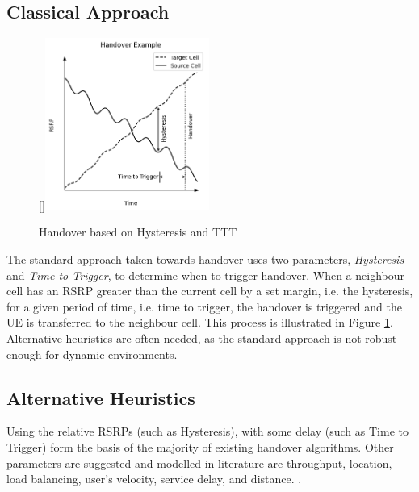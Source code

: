 \subsection{Classical Approach}

\begin{figure}
     \raisebox{0pt}[\dimexpr{}\baselineskip\relax]{\includegraphics[width=0.48\textwidth]{src/img/hysteresis_ttt.png}}
    \caption{Handover based on Hysteresis and TTT}
    \label{fig:hysteresis_handover}
\end{figure}

The standard approach taken towards handover uses two parameters, \textit{Hysteresis} and \textit{Time to Trigger}, to determine when to trigger handover. When a neighbour cell has an RSRP greater than the current cell by a set margin, i.e. the hysteresis, for a given period of time, i.e. time to trigger, the handover is triggered and the UE is transferred to the neighbour cell. This process is illustrated in Figure \ref{fig:hysteresis_handover}. Alternative heuristics are often needed, as the standard approach is not robust enough for dynamic environments.



\clearpage %

\subsection{Alternative Heuristics}
Using the relative RSRPs (such as Hysteresis), with some delay (such as Time to Trigger) form the basis of the majority of existing handover algorithms. Other parameters are suggested and modelled in literature are throughput, location, load balancing, user’s velocity, service delay, and distance. \cite{nyangaresi_efficient_2022}.

